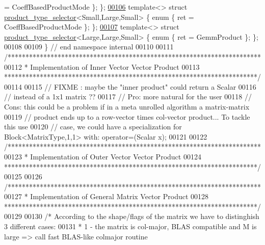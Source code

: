 \begin{DoxyCode}
      = CoeffBasedProductMode \}; \};
\hyperlink{struct_eigen_1_1internal_1_1product__type__selector_3_01_small_00_01_large_00_01_small_01_4}{00106} \textcolor{keyword}{template}<>              \textcolor{keyword}{struct }\hyperlink{struct_eigen_1_1internal_1_1product__type__selector}{product\_type\_selector}<Small,Large,Small>  \{ \textcolor{keyword}{enum} \{ ret 
      = CoeffBasedProductMode \}; \};
\hyperlink{struct_eigen_1_1internal_1_1product__type__selector_3_01_large_00_01_large_00_01_small_01_4}{00107} \textcolor{keyword}{template}<>              \textcolor{keyword}{struct }\hyperlink{struct_eigen_1_1internal_1_1product__type__selector}{product\_type\_selector}<Large,Large,Small>  \{ \textcolor{keyword}{enum} \{ ret 
      = GemmProduct \}; \};
00108 
00109 \} \textcolor{comment}{// end namespace internal}
00110 
00111 \textcolor{comment}{/***********************************************************************}
00112 \textcolor{comment}{*  Implementation of Inner Vector Vector Product}
00113 \textcolor{comment}{***********************************************************************/}
00114 
00115 \textcolor{comment}{// FIXME : maybe the "inner product" could return a Scalar}
00116 \textcolor{comment}{// instead of a 1x1 matrix ??}
00117 \textcolor{comment}{// Pro: more natural for the user}
00118 \textcolor{comment}{// Cons: this could be a problem if in a meta unrolled algorithm a matrix-matrix}
00119 \textcolor{comment}{// product ends up to a row-vector times col-vector product... To tackle this use}
00120 \textcolor{comment}{// case, we could have a specialization for Block<MatrixType,1,1> with: operator=(Scalar x);}
00121 
00122 \textcolor{comment}{/***********************************************************************}
00123 \textcolor{comment}{*  Implementation of Outer Vector Vector Product}
00124 \textcolor{comment}{***********************************************************************/}
00125 
00126 \textcolor{comment}{/***********************************************************************}
00127 \textcolor{comment}{*  Implementation of General Matrix Vector Product}
00128 \textcolor{comment}{***********************************************************************/}
00129 
00130 \textcolor{comment}{/*  According to the shape/flags of the matrix we have to distinghish 3 different cases:}
00131 \textcolor{comment}{ *   1 - the matrix is col-major, BLAS compatible and M is large => call fast BLAS-like colmajor routine}

\end{DoxyCode}
